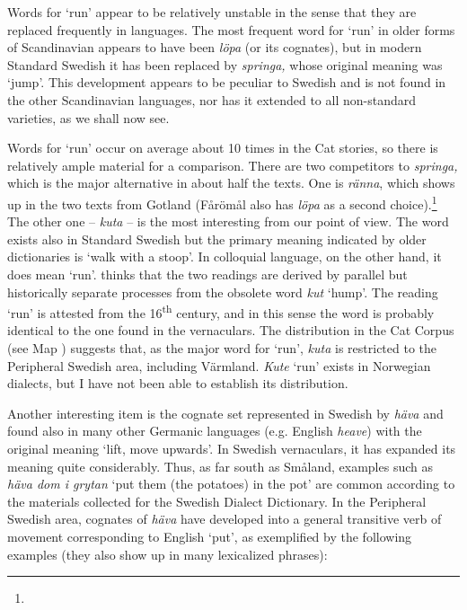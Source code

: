 \begin{styleBodytextC}
Words for ‘run’ appear to be relatively unstable in the sense that they are replaced frequently in languages. The most frequent word for ‘run’ in older forms of Scandinavian appears to have been \textit{löpa }(or its cognates), but in modern Standard Swedish it has been replaced by \textit{springa, }whose original meaning was ‘jump’. This development appears to be peculiar to Swedish and is not found in the other Scandinavian languages, nor has it extended to all non-standard varieties, as we shall now see. 

\end{styleBodytextC}

\begin{styleBodytextC}
Words for ‘run’ occur on average about 10 times in the Cat stories, so there is relatively ample material for a comparison. There are two competitors to \textit{springa, }which is the major alternative in about half the texts. One is \textit{ränna}, which shows up in the two texts from Gotland (Fårömål also has \textit{löpa} as a second choice).\footnote{} The other one – \textit{kuta} – is the most interesting from our point of view. The word exists also in Standard Swedish but the primary meaning indicated by older dictionaries is ‘walk with a stoop’. In colloquial language, on the other hand, it does mean ‘run’. \citet[371]{Hellquist1922} thinks that the two readings are derived by parallel but historically separate processes from the obsolete word \textit{kut} ‘hump’. The reading ‘run’ is attested from the 16\textsuperscript{th} century, and in this sense the word is probably identical to the one found in the vernaculars. The distribution in the Cat Corpus (see Map ) suggests that, as the major word for ‘run’, \textit{kuta} is restricted to the Peripheral Swedish area, including Värmland. \textit{Kute} ‘run’ exists in Norwegian dialects, but I have not been able to establish its distribution.

\end{styleBodytextC}

\begin{styleBodytextC}
Another interesting item is the cognate set represented in Swedish by \textit{häva} and found also in many other Germanic languages (e.g. English \textit{heave}) with the original meaning ‘lift, move upwards’. In Swedish vernaculars, it has expanded its meaning quite considerably. Thus, as far south as Småland, examples such as \textit{häva dom i grytan} ‘put them (the potatoes) in the pot’ are common according to the materials collected for the Swedish Dialect Dictionary. In the Peripheral Swedish area, cognates\textit{ }of \textit{häva} have developed into a general transitive verb of movement corresponding to English ‘put’, as exemplified by the following examples (they also show up in many lexicalized phrases):

\end{styleBodytextC}

